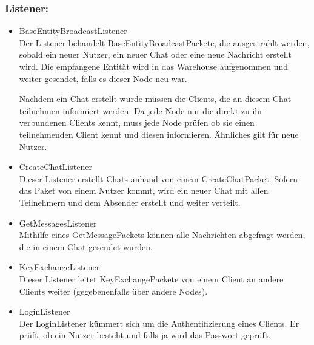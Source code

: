 \subsubsection*{Listener:}
\begin{itemize}
    \item BaseEntityBroadcastListener\\
        Der Listener behandelt BaseEntityBroadcastPackete, die ausgestrahlt werden, sobald ein neuer Nutzer, ein neuer Chat oder eine neue Nachricht erstellt wird. Die empfangene Entität wird in das Warehouse aufgenommen und weiter gesendet, falls es dieser Node neu war.
        
        Nachdem ein Chat erstellt wurde müssen die Clients, die an diesem Chat teilnehmen informiert werden. Da jede Node nur die direkt zu ihr verbundenen Clients kennt, muss jede Node prüfen ob sie einen teilnehmenden Client kennt und diesen informieren. Ähnliches gilt für neue Nutzer.
        
    \item CreateChatListener\\
        Dieser Listener erstellt Chats anhand von einem CreateChatPacket. Sofern das Paket von einem Nutzer kommt, wird ein neuer Chat mit allen Teilnehmern und dem Absender erstellt und weiter verteilt.
        
    \item GetMessagesListener\\
        Mithilfe eines GetMessagePackets können alle Nachrichten abgefragt werden, die in einem Chat gesendet wurden.
        
    \item KeyExchangeListener\\
        Dieser Listener leitet KeyExchangePackete von einem Client an andere Clients weiter (gegebenenfalls über andere Nodes).
        
    \item LoginListener\\
        Der LoginListener kümmert sich um die Authentifizierung eines Clients. Er prüft, ob ein Nutzer besteht und falls ja wird das Passwort geprüft.

\end{itemize}
